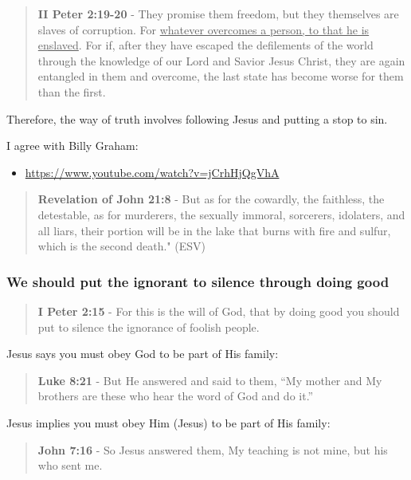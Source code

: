 \documentclass[11pt]{article}
\begin{document}
\begin{quote}
\textbf{II Peter 2:19-20} - They promise them freedom, but they themselves are slaves of corruption. For \uline{whatever overcomes a person, to that he is enslaved}. For if, after they have escaped the defilements of the world through the knowledge of our Lord and Savior Jesus Christ, they are again entangled in them and overcome, the last state has become worse for them than the first.
\end{quote}

Therefore, the way of truth involves following Jesus and putting a stop to sin.

I agree with Billy Graham:
\begin{itemize}
\item \url{https://www.youtube.com/watch?v=jCrhHjQgVhA}
\end{itemize}

\begin{quote}
\textbf{Revelation of John 21:8} - But as for the cowardly, the faithless, the detestable, as for murderers, the sexually immoral, sorcerers, idolaters, and all liars, their portion will be in the lake that burns with fire and sulfur, which is the second death." (ESV)
\end{quote}

\subsubsection{We should put the ignorant to silence through doing good}
\label{sec:orgf77a726}

\begin{quote}
\textbf{I Peter 2:15} - For this is the will of God, that by doing good you should put to silence the ignorance of foolish people.
\end{quote}

Jesus says you must obey God to be part of His family:

\begin{quote}
\textbf{Luke 8:21} - But He answered and said to them, “My mother and My brothers are these who hear the word of God and do it.”
\end{quote}

Jesus implies you must obey Him (Jesus) to be part of His family:

\begin{quote}
\textbf{John 7:16} - So Jesus answered them, My teaching is not mine, but his who sent me.
\end{quote}
\end{document}
